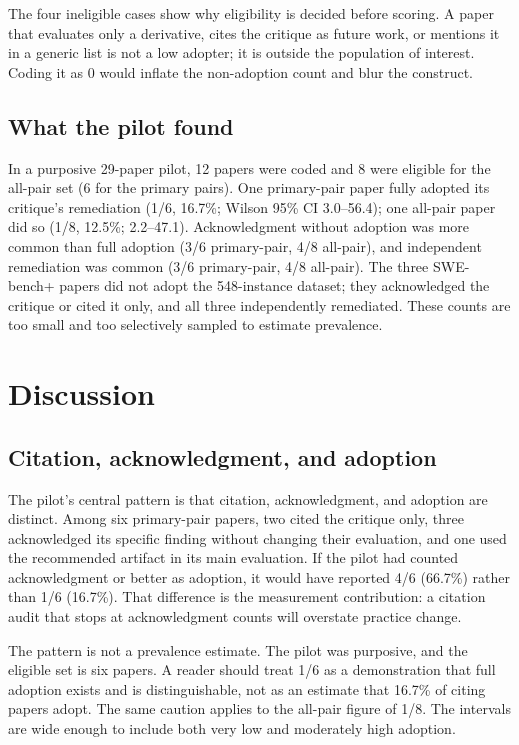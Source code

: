 \documentclass[11pt,a4paper]{article}
\begin{document}
The four ineligible cases show why eligibility is decided before scoring. A paper that evaluates only a derivative, cites the critique as future work, or mentions it in a generic list is not a low adopter; it is outside the population of interest. Coding it as 0 would inflate the non-adoption count and blur the construct.

\subsection{What the pilot found}

In a purposive 29-paper pilot, 12 papers were coded and 8 were eligible for the all-pair set (6 for the primary pairs). One primary-pair paper fully adopted its critique's remediation (1/6, 16.7\%; Wilson 95\% CI 3.0--56.4); one all-pair paper did so (1/8, 12.5\%; 2.2--47.1). Acknowledgment without adoption was more common than full adoption (3/6 primary-pair, 4/8 all-pair), and independent remediation was common (3/6 primary-pair, 4/8 all-pair). The three SWE-bench+ papers did not adopt the 548-instance dataset; they acknowledged the critique or cited it only, and all three independently remediated. These counts are too small and too selectively sampled to estimate prevalence.

\section{Discussion}

\subsection{Citation, acknowledgment, and adoption}

The pilot's central pattern is that citation, acknowledgment, and adoption are distinct. Among six primary-pair papers, two cited the critique only, three acknowledged its specific finding without changing their evaluation, and one used the recommended artifact in its main evaluation. If the pilot had counted acknowledgment or better as adoption, it would have reported 4/6 (66.7\%) rather than 1/6 (16.7\%). That difference is the measurement contribution: a citation audit that stops at acknowledgment counts will overstate practice change.

The pattern is not a prevalence estimate. The pilot was purposive, and the eligible set is six papers. A reader should treat 1/6 as a demonstration that full adoption exists and is distinguishable, not as an estimate that 16.7\% of citing papers adopt. The same caution applies to the all-pair figure of 1/8. The intervals are wide enough to include both very low and moderately high adoption.
\end{document}
